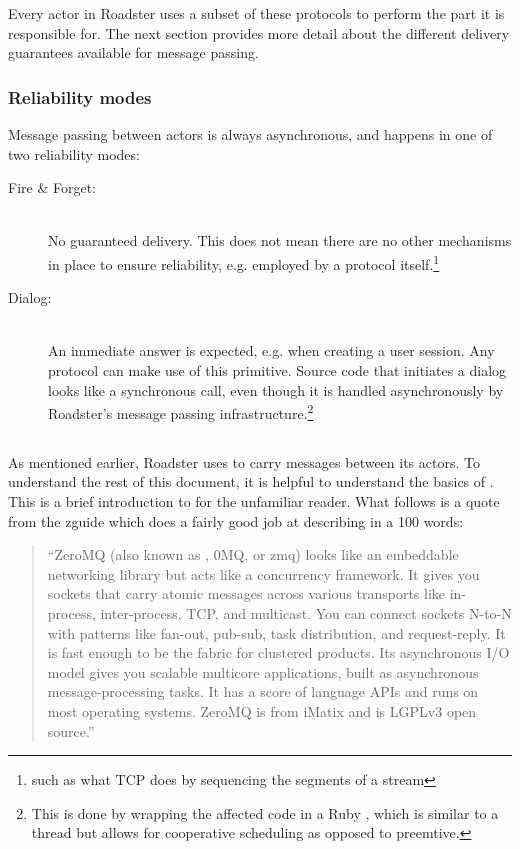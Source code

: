 Every actor in Roadster uses a subset of these protocols to perform the part it
is responsible for. The next section provides more detail about the different
delivery guarantees available for message passing.

\subsubsection{Reliability modes}
Message passing between actors is always asynchronous, and happens in one of
two reliability modes:

\begin{description}
\item [Fire \& Forget:]\hfill\\
No guaranteed delivery. This does not mean there are no other mechanisms in
place to ensure reliability, e.g. employed by a protocol itself.\footnote{such
as what \gls{TCP} does by sequencing the segments of a stream}

\item [Dialog:]\hfill\\
An immediate answer is expected, e.g. when creating a user
session. Any protocol can make use of this primitive. Source code that
initiates a dialog looks like a synchronous call, even though
it is handled asynchronously by Roadster's message passing
infrastructure.\footnote{This is done by wrapping the affected
code in a Ruby , which is similar to a thread but
allows for cooperative scheduling as opposed to preemtive.}
\end{description}


\subsection{\zmq}\label{sec:scope:zmq}
As mentioned earlier, Roadster uses \zmq to carry messages between its actors.
To understand the rest of this document, it is
helpful to understand the basics of \zmq. This is a brief introduction to
\zmq for the unfamiliar reader. What follows is a quote from the \gls{zguide}
which does a fairly good job at describing \zmq in a 100 words:

\begin{quote}
``ZeroMQ (also known as \zmq, 0MQ, or zmq) looks like an embeddable networking
library but acts like a concurrency framework. It gives you sockets that carry
atomic messages across various transports like in-process, inter-process, TCP,
and multicast. You can connect sockets N-to-N with patterns like fan-out,
pub-sub, task distribution, and request-reply. It is fast enough to be the
fabric for clustered products. Its asynchronous I/O model gives you scalable
multicore applications, built as asynchronous message-processing tasks. It has
a score of language APIs and runs on most operating systems.  ZeroMQ is from
iMatix and is LGPLv3 open source.''
\end{quote}

